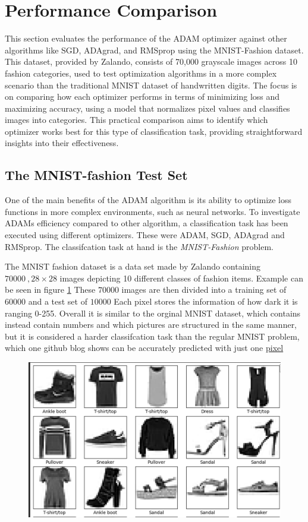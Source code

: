 \documentclass[oneside]{article}
\begin{document}
\section{Performance Comparison}

This section evaluates the performance of the ADAM optimizer against other algorithms like SGD, ADAgrad, and RMSprop using the MNIST-Fashion dataset. This dataset, provided by Zalando, consists of 70,000 grayscale images across 10 fashion categories, used to test optimization algorithms in a more complex scenario than the traditional MNIST dataset of handwritten digits. The focus is on comparing how each optimizer performs in terms of minimizing loss and maximizing accuracy, using a model that normalizes pixel values and classifies images into categories. This practical comparison aims to identify which optimizer works best for this type of classification task, providing straightforward insights into their effectiveness.
\subsection{The MNIST-fashion Test Set}
One of the main benefits of the ADAM algorithm is its ability to optimize loss functions in more complex environments, such as neural networks. To investigate ADAMs efficiency compared to other algorithm, a classification task has been executed using different optimizers. These were ADAM, SGD, ADAgrad and RMSprop. The classifcation task at hand is the \textit{MNIST-Fashion} problem.\par

The MNIST fashion dataset is a data set made by Zalando containing $70 000 \ ,28 \times 28$ images depicting 10 different classes of fashion items. Example can be seen in figure \ref{fig:fashion_items} These $70 000$ images are then divided into a training set of $60000$ and a test set of $10000$
Each pixel stores the information of how dark it is ranging 0-255. Overall it is similar to the orginal MNIST dataset, which contains instead contain numbers and which pictures are structured in the same manner, but it is considered a harder classifcation task than the regular MNIST problem, which one  github blog shows can be accurately predicted with just one \href{https://gist.github.com/dgrtwo/aaef94ecc6a60cd50322c0054cc04478}{pixel}
\begin{figure}[h!]
    \centering
    \includegraphics[width=0.42\linewidth]{report/figures/example_items.pdf}
    \label{fig:fashion_items}
\end{figure}
\end{document}
